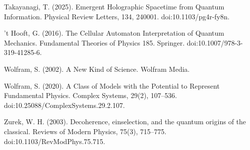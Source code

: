 \documentclass[11pt,oneside]{report}
\theoremstyle{definition}
\theoremstyle{remark}
\newenvironment{reflist}
  {\par\small\setlength{\parindent}{0pt}%
   \setlength{\leftskip}{1.6em}\setlength{\parindent}{-1.6em}%
   \setlength{\parskip}{0.4em}%
   \raggedright\hyphenpenalty=50\exhyphenpenalty=50\relax
   \sloppy}
  {\par}
\begin{document}
\begin{reflist}
Takayanagi, T. (2025). Emergent Holographic Spacetime from Quantum
Information. Physical Review Letters, 134, 240001.
doi:10.1103/pg4r-fy8n.

't Hooft, G. (2016). The Cellular Automaton Interpretation of Quantum
Mechanics. Fundamental Theories of Physics 185. Springer.
doi:10.1007/978-3-319-41285-6.

Wolfram, S. (2002). A New Kind of Science. Wolfram Media.

Wolfram, S. (2020). A Class of Models with the Potential to Represent
Fundamental Physics. Complex Systems, 29(2), 107--536.
doi:10.25088/ComplexSystems.29.2.107.

Zurek, W. H. (2003). Decoherence, einselection, and the quantum origins
of the classical. Reviews of Modern Physics, 75(3), 715--775.
doi:10.1103/RevModPhys.75.715.
\end{reflist}

\clearpage
\end{document}
